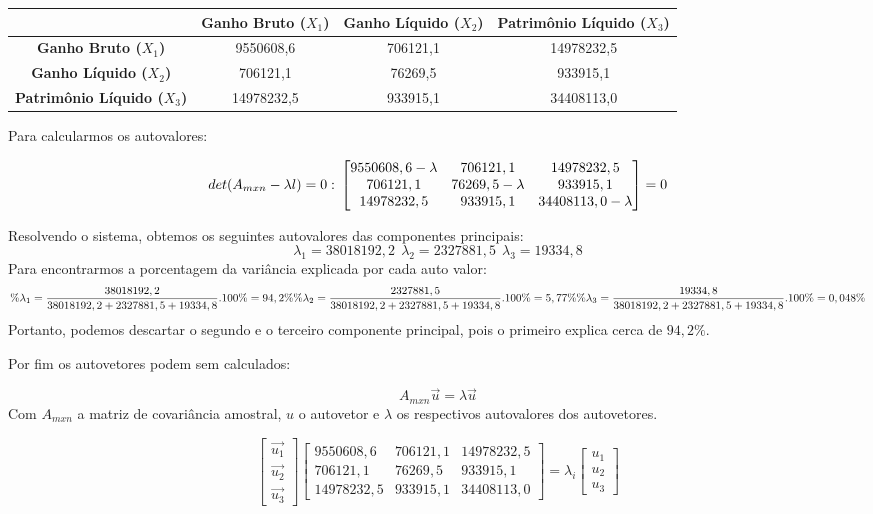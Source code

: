 \documentclass[
]{book}
\begin{document}
\begin{longtable}[]{@{}cccc@{}}
\toprule
& \textbf{Ganho Bruto (\(X_1\))} & \textbf{Ganho Líquido (\(X_2\))} & \textbf{Patrimônio Líquido (\(X_3\))}\tabularnewline
\midrule
\endhead
\textbf{Ganho Bruto (\(X_1\))} & 9550608,6 & 706121,1 & 14978232,5\tabularnewline
\textbf{Ganho Líquido (\(X_2\))} & 706121,1 & 76269,5 & 933915,1\tabularnewline
\textbf{Patrimônio Líquido (\(X_3\))} & 14978232,5 & 933915,1 & 34408113,0\tabularnewline
\bottomrule
\end{longtable}

Para calcularmos os autovalores:

\[det(A_{mxn}-\lambda l)=0: \\
\begin{bmatrix}
9550608,6 -\lambda &706121,1 &14978232,5\\ 
706121,1 &76269,5-\lambda & 933915,1 \\
14978232,5&933915,1&34408113,0-\lambda
\end{bmatrix}=0\]

Resolvendo o sistema, obtemos os seguintes autovalores das componentes principais:
\[\lambda_1=38018192,2 \ \ \lambda_2=2327881,5 \ \ \lambda_3=19334,8\]
Para encontrarmos a porcentagem da variância explicada por cada auto valor:
\[\%\lambda_1=\frac{38018192,2}{38018192,2+2327881,5+19334,8}.100\%=94,2\% \\ \%\lambda_2=\frac{2327881,5}{38018192,2+2327881,5+19334,8}.100\%=5,77\% \\ \%\lambda_3=\frac{19334,8}{38018192,2+2327881,5+19334,8}.100\%=0,048\%\]
Portanto, podemos descartar o segundo e o terceiro componente principal, pois o primeiro explica cerca de \(94,2\%\).

Por fim os autovetores podem sem calculados:

\[A_{mxn}\vec{u}=\lambda \vec{u}\]
Com \(A_{mxn}\) a matriz de covariância amostral, \(u\) o autovetor e \(\lambda\) os respectivos autovalores dos autovetores.

\[\begin{bmatrix}
\vec{u_1}\\ \vec{u_2} \\ \vec{u_3}
\end{bmatrix}
\begin{bmatrix}
9550608,6  &706121,1 &14978232,5\\ 
706121,1 &76269,5 & 933915,1 \\
14978232,5&933915,1&34408113,0
\end{bmatrix}  = \lambda_i \begin{bmatrix}
u_1\\ u_2 \\ u_3
\end{bmatrix} \]
\end{document}
